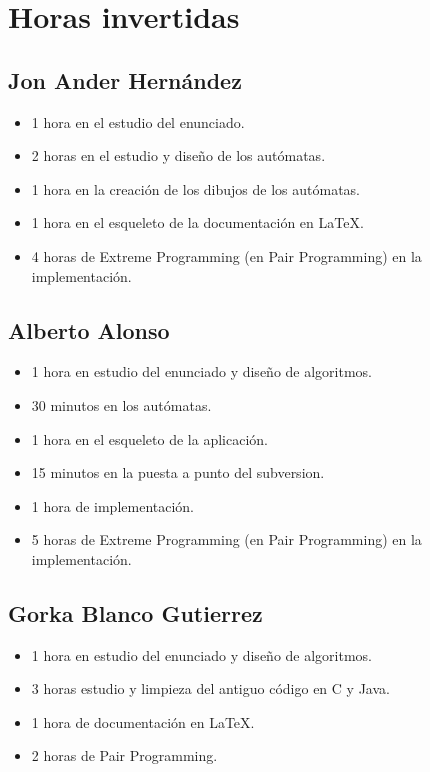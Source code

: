 
\chapter{Horas invertidas}

    \section{Jon Ander Hernández}
    
        \begin{itemize}
            \item 1 hora en el estudio del enunciado.
            \item 2 horas en el estudio y diseño de los autómatas.
            \item 1 hora en la creación de los dibujos de los autómatas.
            \item 1 hora en el esqueleto de la documentación en \LaTeX.
            \item 4 horas de Extreme Programming (en Pair Programming) en la implementación.
         \end{itemize}
    
    \section{Alberto Alonso}
    
        \begin{itemize}
            \item 1 hora en estudio del enunciado y diseño de algoritmos.
            \item 30 minutos en los autómatas.
            \item 1 hora en el esqueleto de la aplicación.
            \item 15 minutos en la puesta a punto del subversion.
            \item 1 hora de implementación.
            \item 5 horas de Extreme Programming (en Pair Programming) en la implementación.
        \end{itemize}
    
    \section{Gorka Blanco Gutierrez}
    
        \begin{itemize}
            \item 1 hora en estudio del enunciado y diseño de algoritmos.
            \item 3 horas estudio y limpieza del antiguo código en C y Java.
            \item 1 hora de documentación en \LaTeX.
            \item 2 horas de Pair Programming.
        \end{itemize}